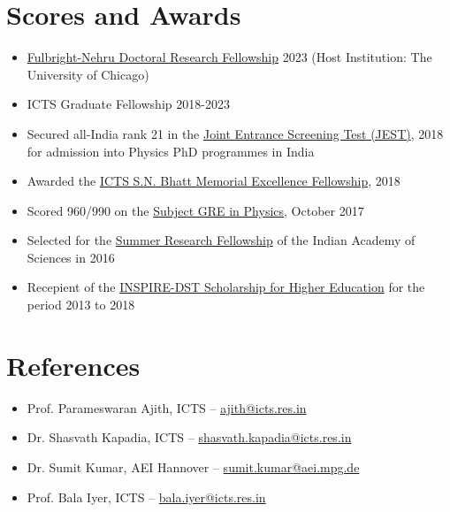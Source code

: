 \documentclass[margin, centered]{res}
\begin{document}
\begin{resume}
\section{Scores and Awards}
\begin{itemize}[leftmargin=*]
 \item \href{https://www.usief.org.in/Fulbright-Nehru-Doctoral-Research-Fellowships.aspx}{Fulbright-Nehru Doctoral Research Fellowship} 2023 (Host Institution: The University of Chicago)
 \item ICTS Graduate Fellowship 2018-2023
 \item Secured all-India rank 21 in the \href{https://www.jest.org.in/}{Joint Entrance Screening Test (JEST)}, 2018 for admission into Physics PhD programmes in India
 \item Awarded the \href{https://www.icts.res.in/academic/summer-research-program}{ICTS S.N. Bhatt Memorial Excellence Fellowship}, 2018
 \item Scored 960/990 on the \href{https://www.ets.org/gre/subject/about/content/physics}{Subject GRE in Physics}, October 2017
 \item Selected for the \href{http://web-japps.ias.ac.in:8080/fellowship2018/}{Summer Research Fellowship} of the Indian Academy of Sciences in 2016
 \item Recepient of the \href{http://www.inspire-dst.gov.in/scholarship.html}{INSPIRE-DST Scholarship for Higher Education} for the period 2013 to 2018
\end{itemize}

\section{References}
\begin{itemize}[leftmargin=*]
 \item Prof. Parameswaran Ajith, ICTS -- \href{mailto:ajith@icts.res.in}{ajith@icts.res.in}
 \item Dr. Shasvath Kapadia, ICTS -- \href{mailto:shasvath.kapadia@icts.res.in}{shasvath.kapadia@icts.res.in}
 \item Dr. Sumit Kumar, AEI Hannover -- \href{mailto:sumit.kumar@aei.mpg.de}{sumit.kumar@aei.mpg.de}
 \item Prof. Bala Iyer, ICTS -- \href{mailto:bala.iyer@icts.res.in}{bala.iyer@icts.res.in}
\end{itemize}

\end{resume}
\end{document}
